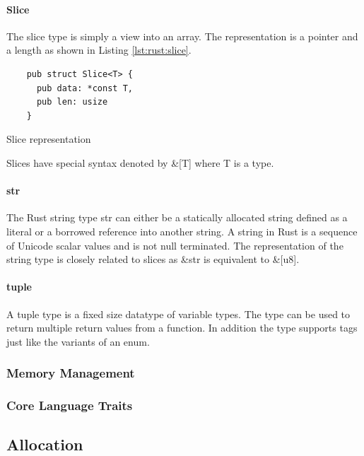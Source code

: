 \paragraph{Slice}

The slice type is simply a view into an array.
The representation is a pointer and a length as shown in Listing \ref{lst:rust:slice}.

\begin{listing}[H]
  \begin{verbatim}
    pub struct Slice<T> {
      pub data: *const T,
      pub len: usize
    }
\end{verbatim}
\caption{Slice representation}
\label{lst:rust:slice}
\end{listing}

Slices have special syntax denoted by \&[T] where T is a type.

\paragraph{str}
\label{par:rust:str}

The Rust string type str can either be a statically allocated string defined as a literal or a borrowed reference into another string.
A string in Rust is a sequence of Unicode scalar values and is not null terminated.
The representation of the string type is closely related to slices as \&str is equivalent to \&[u8].

\paragraph{tuple}

A tuple type is a fixed size datatype of variable types.
The type can be used to return multiple return values from a function.
In addition the type supports tags just like the variants of an enum.

\subsubsection{Memory Management}
\subsubsection{Core Language Traits}

\subsection{Allocation}
\label{sec:rust:allocation}


